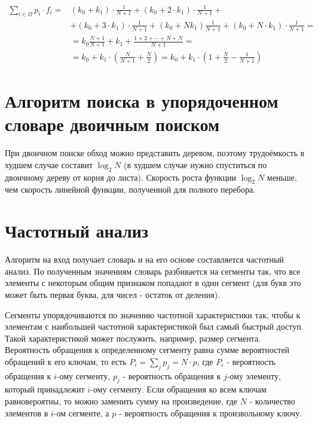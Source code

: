\begin{equation}
    \label{for:brute}
    \begin{aligned}
        \sum\limits_{i \in \Omega} p_i \cdot f_i = & (k_0 + k_1) \cdot \frac{1}{N + 1} + (k_0 + 2 \cdot k_1) \cdot \frac{1}{N+1} +\\
        & + (k_0 + 3 \cdot k_1) \cdot \frac{1}{N + 1} + (k_0 + Nk_1)\frac{1}{N + 1} + (k_0 + N \cdot k_1) \cdot \frac{1}{N + 1} =\\
        & = k_0\frac{N+1}{N+1}+k_1+\frac{1 + 2 + \cdots + N + N}{N + 1} = \\
        & = k_0 + k_1 \cdot \left(\frac{N}{N + 1} + \frac{N}{2}\right) = k_0 + k_1 \cdot \left(1 + \frac{N}{2} - \frac{1}{N + 1}\right)
    \end{aligned}
\end{equation}

\section{Алгоритм поиска в упорядоченном словаре двоичным поиском}

При двоичном поиске обход можно представить деревом, поэтому трудоёмкость в худшем случае составит $\log_2 N$ (в худшем случае нужно спуститься по двоичному дереву от корня до листа). Скорость роста функции $\log_2 N$ меньше, чем скорость линейной функции, полученной для полного перебора.

\section{Частотный анализ}
Алгоритм на вход получает словарь и на его основе составляется частотный анализ. По полученным значениям словарь разбивается на сегменты так, что все элементы с некоторым общим признаком попадают в один сегмент (для букв это может быть первая буква, для чисел - остаток от деления). 

Сегменты упорядочиваются по значению частотной характеристики так, чтобы к элементам с наибольшей частотной характеристикой был самый быстрый доступ. Такой характеристикой может послужить, например, размер сегмента. Вероятность обращения к определенному сегменту равна сумме вероятностей обращений к его ключам, то есть $P_i = \sum_{j}p_j = N \cdot p$, где $P_i$ - вероятность обращения к $i$-ому сегменту, $p_j$ - вероятность обращения к $j$-ому элементу, который принадлежит $i$-ому сегменту. Если обращения ко всем ключам равновероятны, то можно заменить сумму на произведение, где $N$ - количество элементов в $i$-ом сегменте, а $p$ - вероятность обращения к произвольному ключу.

